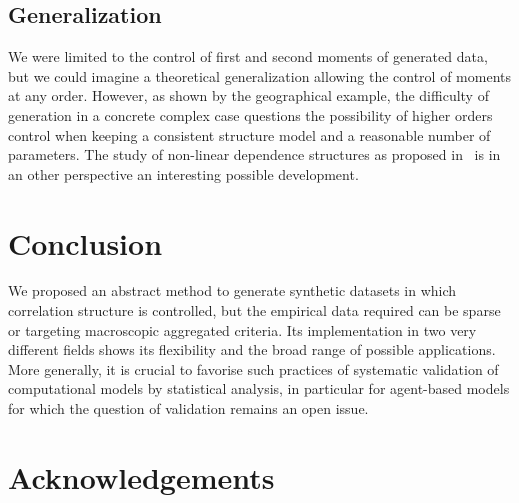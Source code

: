 \documentclass{article}
\begin{document}


\subsection*{Generalization}

We were limited to the control of first and second moments of generated data, but we could imagine a theoretical generalization allowing the control of moments at any order. However, as shown by the geographical example, the difficulty of generation in a concrete complex case questions the possibility of higher orders control when keeping a consistent structure model and a reasonable number of parameters. The study of non-linear dependence structures as proposed in~\cite{chicheportiche2013nested} is in an other perspective an interesting possible development.






\section*{Conclusion}


We proposed an abstract method to generate synthetic datasets in which correlation structure is controlled, but the empirical data required can be sparse or targeting macroscopic aggregated criteria. Its implementation in two very different fields shows its flexibility and the broad range of possible applications. More generally, it is crucial to favorise such practices of systematic validation of computational models by statistical analysis, in particular for agent-based models for which the question of validation remains an open issue.




\section*{Acknowledgements}
 
\end{document}
